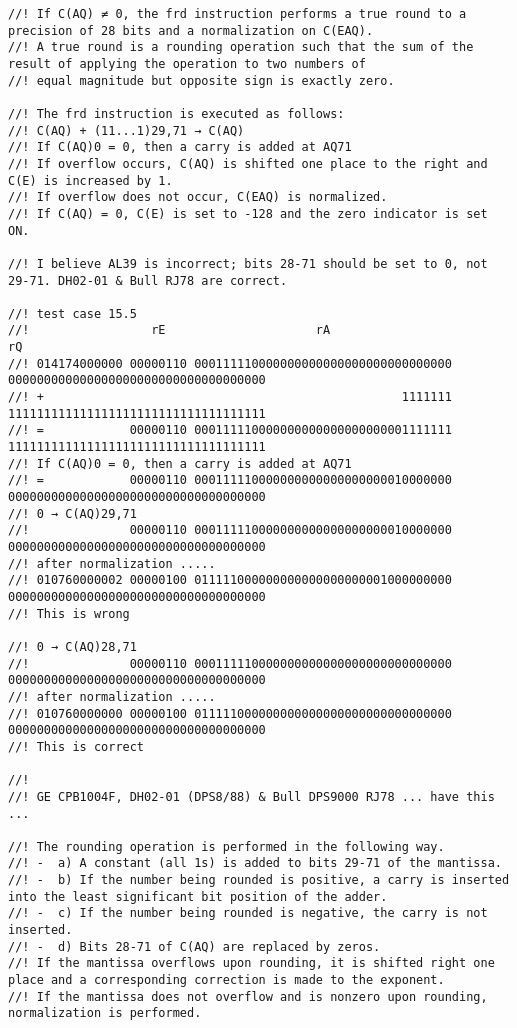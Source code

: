\documentclass[notitlepage]{report}
\begin{document}
\begin{verbatim}
//! If C(AQ) ≠ 0, the frd instruction performs a true round to a precision of 28 bits and a normalization on C(EAQ).
//! A true round is a rounding operation such that the sum of the result of applying the operation to two numbers of
//! equal magnitude but opposite sign is exactly zero.

//! The frd instruction is executed as follows:
//! C(AQ) + (11...1)29,71 → C(AQ)
//! If C(AQ)0 = 0, then a carry is added at AQ71
//! If overflow occurs, C(AQ) is shifted one place to the right and C(E) is increased by 1.
//! If overflow does not occur, C(EAQ) is normalized.
//! If C(AQ) = 0, C(E) is set to -128 and the zero indicator is set ON.

//! I believe AL39 is incorrect; bits 28-71 should be set to 0, not 29-71. DH02-01 & Bull RJ78 are correct.

//! test case 15.5
//!                 rE                     rA                                     rQ
//! 014174000000 00000110 000111110000000000000000000000000000 000000000000000000000000000000000000
//! +                                                  1111111 111111111111111111111111111111111111
//! =            00000110 000111110000000000000000000001111111 111111111111111111111111111111111111
//! If C(AQ)0 = 0, then a carry is added at AQ71
//! =            00000110 000111110000000000000000000010000000 000000000000000000000000000000000000
//! 0 → C(AQ)29,71
//!              00000110 000111110000000000000000000010000000 000000000000000000000000000000000000
//! after normalization .....
//! 010760000002 00000100 011111000000000000000000001000000000 000000000000000000000000000000000000
//! This is wrong

//! 0 → C(AQ)28,71
//!              00000110 000111110000000000000000000000000000 000000000000000000000000000000000000
//! after normalization .....
//! 010760000000 00000100 011111000000000000000000000000000000 000000000000000000000000000000000000
//! This is correct

//!
//! GE CPB1004F, DH02-01 (DPS8/88) & Bull DPS9000 RJ78 ... have this ...

//! The rounding operation is performed in the following way.
//! -  a) A constant (all 1s) is added to bits 29-71 of the mantissa.
//! -  b) If the number being rounded is positive, a carry is inserted into the least significant bit position of the adder.
//! -  c) If the number being rounded is negative, the carry is not inserted.
//! -  d) Bits 28-71 of C(AQ) are replaced by zeros.
//! If the mantissa overflows upon rounding, it is shifted right one place and a corresponding correction is made to the exponent.
//! If the mantissa does not overflow and is nonzero upon rounding, normalization is performed.


\end{verbatim}
\end{document}
